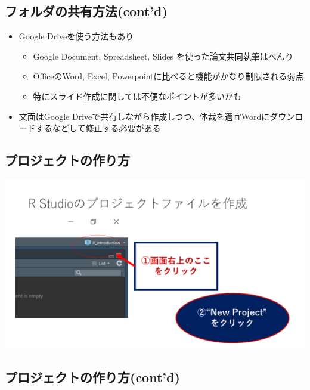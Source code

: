 \documentclass[
]{ltjsarticle}
\providecommand{\tightlist}{%
  \setlength{\itemsep}{0pt}\setlength{\parskip}{0pt}}
\begin{document}
\hypertarget{ux30d5ux30a9ux30ebux30c0ux306eux5171ux6709ux65b9ux6cd5contd}{%
\subsection{フォルダの共有方法(cont'd)}\label{ux30d5ux30a9ux30ebux30c0ux306eux5171ux6709ux65b9ux6cd5contd}}

\begin{itemize}
\tightlist
\item
  Google Driveを使う方法もあり

  \begin{itemize}
  \tightlist
  \item
    Google Document, Spreadsheet, Slides を使った論文共同執筆はべんり
  \item
    OfficeのWord, Excel, Powerpointに比べると機能がかなり制限される弱点
  \item
    特にスライド作成に関しては不便なポイントが多いかも
  \end{itemize}
\item
  文面はGoogle
  Driveで共有しながら作成しつつ、体裁を適宜Wordにダウンロードするなどして修正する必要がある
\end{itemize}

\hypertarget{ux30d7ux30edux30b8ux30a7ux30afux30c8ux306eux4f5cux308aux65b9}{%
\subsection{プロジェクトの作り方}\label{ux30d7ux30edux30b8ux30a7ux30afux30c8ux306eux4f5cux308aux65b9}}

\begin{center}\includegraphics[width=0.95\linewidth]{figs/create_repository} \end{center}

\hypertarget{ux30d7ux30edux30b8ux30a7ux30afux30c8ux306eux4f5cux308aux65b9contd}{%
\subsection{プロジェクトの作り方(cont'd)}\label{ux30d7ux30edux30b8ux30a7ux30afux30c8ux306eux4f5cux308aux65b9contd}}
\end{document}

